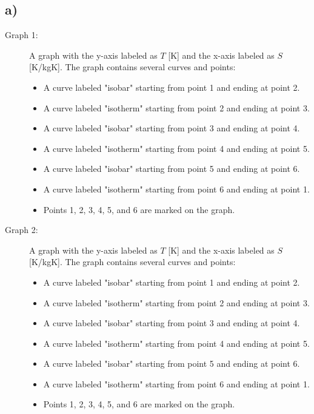 

\subsection*{a)}

\begin{description}
    \item[Graph 1:] A graph with the y-axis labeled as $T$ [K] and the x-axis labeled as $S$ [K/kgK]. The graph contains several curves and points:
    \begin{itemize}
        \item A curve labeled "isobar" starting from point 1 and ending at point 2.
        \item A curve labeled "isotherm" starting from point 2 and ending at point 3.
        \item A curve labeled "isobar" starting from point 3 and ending at point 4.
        \item A curve labeled "isotherm" starting from point 4 and ending at point 5.
        \item A curve labeled "isobar" starting from point 5 and ending at point 6.
        \item A curve labeled "isotherm" starting from point 6 and ending at point 1.
        \item Points 1, 2, 3, 4, 5, and 6 are marked on the graph.
    \end{itemize}
    
    \item[Graph 2:] A graph with the y-axis labeled as $T$ [K] and the x-axis labeled as $S$ [K/kgK]. The graph contains several curves and points:
    \begin{itemize}
        \item A curve labeled "isobar" starting from point 1 and ending at point 2.
        \item A curve labeled "isotherm" starting from point 2 and ending at point 3.
        \item A curve labeled "isobar" starting from point 3 and ending at point 4.
        \item A curve labeled "isotherm" starting from point 4 and ending at point 5.
        \item A curve labeled "isobar" starting from point 5 and ending at point 6.
        \item A curve labeled "isotherm" starting from point 6 and ending at point 1.
        \item Points 1, 2, 3, 4, 5, and 6 are marked on the graph.
    \end{itemize}
\end{description}
